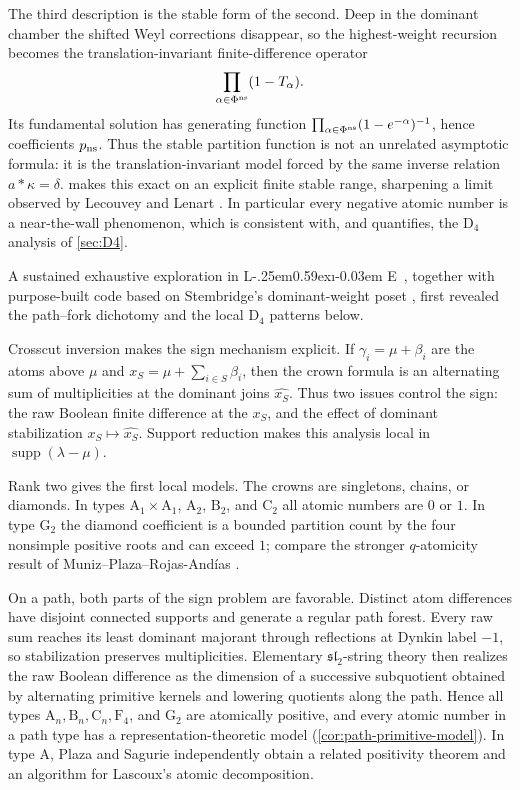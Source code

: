 \documentclass[11pt]{article}
\theoremstyle{definition}
\theoremstyle{remark}
\newcommand{\Raiz}{\Phi}
\newcommand{\supp}{\operatorname{supp}}
\newcommand{\typeA}{\ensuremath{\mathrm{A}}}
\newcommand{\typeB}{\ensuremath{\mathrm{B}}}
\newcommand{\typeC}{\ensuremath{\mathrm{C}}}
\newcommand{\typeD}{\ensuremath{\mathrm{D}}}
\newcommand{\typeF}{\ensuremath{\mathrm{F}}}
\newcommand{\typeG}{\ensuremath{\mathrm{G}}}
\def\LiE{{\ssfnt L\kern-.25em\raise0.59ex\hbox{\i}\kern-0.03em E}}
\begin{document}
The third description is the stable form of the second.  Deep in the dominant
chamber the shifted Weyl corrections disappear, so the highest-weight
recursion becomes the translation-invariant finite-difference operator
\[
   \prod_{\alpha\in\Raiz^{\rm ns}}(1-T_\alpha).
\]
Its fundamental solution has generating function
$\prod_{\alpha\in\Raiz^{\rm ns}}(1-e^{-\alpha})^{-1}$, hence coefficients
$p_{\rm ns}$.  Thus the stable partition function is not an unrelated
asymptotic formula: it is the translation-invariant model forced by the same
inverse relation $a*\kappa=\delta$.   makes this
exact on an explicit finite stable range, sharpening a limit observed by
Lecouvey and Lenart \cite{MR4178925}.  In particular every negative atomic
number is a near-the-wall phenomenon, which is consistent with, and quantifies,
the $\typeD_4$ analysis of \cref{sec:D4}.

A sustained exhaustive exploration in \LiE\ \cite{LiE}, together with
purpose-built code based on Stembridge's dominant-weight poset
\cite{Stembridge}, first revealed the path--fork dichotomy and the local
$\typeD_4$ patterns below.

Crosscut inversion makes the sign mechanism explicit.  If
$\gamma_i=\mu+\beta_i$ are the atoms above $\mu$ and
$x_S=\mu+\sum_{i\in S}\beta_i$, then the crown formula is an alternating sum
of multiplicities at the dominant joins $\widehat{x_S}$.  Thus two issues
control the sign: the raw Boolean finite difference at the $x_S$, and the
effect of dominant stabilization $x_S\mapsto\widehat{x_S}$.  Support reduction
makes this analysis local in $\supp(\lambda-\mu)$.

Rank two gives the first local models.  The crowns are singletons, chains, or
diamonds.  In types $\typeA_1\times\typeA_1$, $\typeA_2$, $\typeB_2$, and
$\typeC_2$ all atomic numbers are $0$ or $1$.  In type $\typeG_2$ the diamond
coefficient is a bounded partition count by the four nonsimple positive roots
and can exceed $1$; compare the stronger $q$-atomicity result of
Muniz--Plaza--Rojas-And\'ias \cite{Muniz-Plaza-Rojas-G2}.

On a path, both parts of the sign problem are favorable.  Distinct atom
differences have disjoint connected supports and generate a regular path
forest.  Every raw sum reaches its least dominant majorant through reflections
at Dynkin label $-1$, so stabilization preserves multiplicities.  Elementary
$\mathfrak{sl}_2$-string theory then realizes the raw Boolean difference as the
dimension of a successive subquotient obtained by alternating primitive
kernels and lowering quotients along the path.  Hence all types
$\typeA_n,\typeB_n,\typeC_n,\typeF_4$, and $\typeG_2$ are atomically positive,
and every atomic number in a path type has a representation-theoretic model
(\cref{cor:path-primitive-model}).  In type $\typeA$, Plaza and Sagurie
\cite{Plaza-Sagurie} independently obtain a related positivity theorem and an
algorithm for Lascoux's atomic decomposition.
\end{document}
